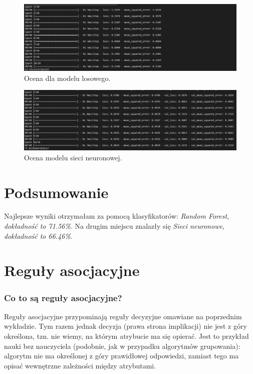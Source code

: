 \documentclass{article}
\begin{document}
\begin{figure}[!htb]
\centering
\includegraphics[width=\textwidth]{image/SN2.png}
\caption{Ocena dla modelu losowego.}
\end{figure}

\begin{figure}[!htb]
\centering
\includegraphics[width=\textwidth]{image/SN3.png}
\caption{Ocena modelu sieci neuronowej.}
\end{figure}

\newpage

\section{Podsumowanie}
\textbf{} Najlepsze wyniki otrzymałam za pomocą klasyfikatorów: \emph{Random Forest, dokładność to \emph{71.56\%}}. Na drugim miejscu znalazły się \emph{Sieci neuronowe, dokładność to \emph{66.46\%}}.

\newpage
\section{Reguły asocjacyjne}

\subsubsection{Co to są reguły asocjacyjne?}
Reguły asocjacyjne przypominają reguły decyzyjne omawiane na poprzednim wykładzie. Tym razem jednak decyzja (prawa strona implikacji) nie jest z góry określona, tzn. nie wiemy, na którym atrybucie ma się opierać. Jest to przykład nauki bez nauczyciela (podobnie, jak w przypadku algorytmów grupowania): algorytm nie ma określonej z góry prawidłowej odpowiedzi, zamiast tego ma opisać wewnętrzne zależności między atrybutami.
\end{document}
